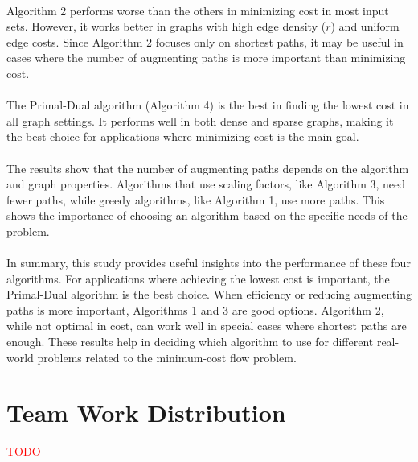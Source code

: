 \documentclass{article}
\begin{document}
\paragraph{}
Algorithm 2 performs worse than the others in minimizing cost in most input sets. However, it works better in graphs with high edge density (\( r \)) and uniform edge costs. Since Algorithm 2 focuses only on shortest paths, it may be useful in cases where the number of augmenting paths is more important than minimizing cost.

\paragraph{}
The Primal-Dual algorithm (Algorithm 4) is the best in finding the lowest cost in all graph settings. It performs well in both dense and sparse graphs, making it the best choice for applications where minimizing cost is the main goal.

\paragraph{}
The results show that the number of augmenting paths depends on the algorithm and graph properties. Algorithms that use scaling factors, like Algorithm 3, need fewer paths, while greedy algorithms, like Algorithm 1, use more paths. This shows the importance of choosing an algorithm based on the specific needs of the problem.

\paragraph{}
In summary, this study provides useful insights into the performance of these four algorithms. For applications where achieving the lowest cost is important, the Primal-Dual algorithm is the best choice. When efficiency or reducing augmenting paths is more important, Algorithms 1 and 3 are good options. Algorithm 2, while not optimal in cost, can work well in special cases where shortest paths are enough. These results help in deciding which algorithm to use for different real-world problems related to the minimum-cost flow problem.

\section{Team Work Distribution}
\textcolor{red}{TODO}


\end{document}
